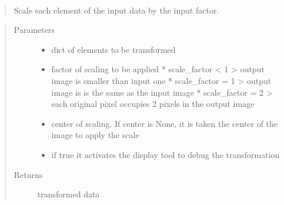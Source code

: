 \documentclass[letterpaper,10pt,english]{sphinxmanual}
\begin{document}
\begin{fulllineitems}
\label{\detokenize{ida_lib.operations:ida_lib.operations.transforms.scale}}~\begin{quote}

Scale each element of the input data by the input factor.
\end{quote}
\begin{quote}\begin{description}
\item[{Parameters}] \leavevmode\begin{itemize}
\item {} 
 \textendash{} dict of elements to be transformed

\item {} 
 \textendash{} factor of scaling to be applied
* scale\_factor \textless{} 1 \sphinxhyphen{}\textgreater{} output image is smaller than input one
* scale\_factor = 1 \sphinxhyphen{}\textgreater{} output image is is the same as the input image
* scale\_factor = 2 \sphinxhyphen{}\textgreater{} each original pixel occupies 2 pixels in the output image

\item {} 
 \textendash{} center of scaling. If center is None, it is taken the center of the image to apply the scale

\item {} 
 \textendash{} if true it activates the display tool to debug the transformation

\end{itemize}

\item[{Returns}] \leavevmode
transformed data

\end{description}\end{quote}

\end{fulllineitems}
\end{document}
